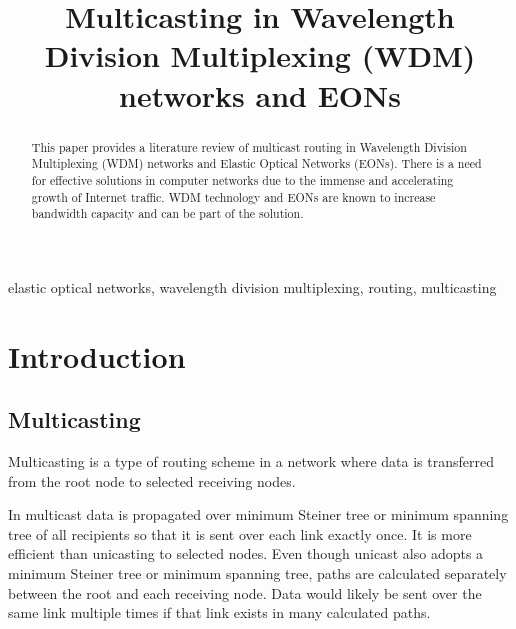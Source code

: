 \documentclass[conference]{IEEEtran}
\begin{document}
\title{Multicasting in Wavelength Division Multiplexing (WDM) networks and EONs}

\author{
\and
{}
}

\maketitle

\begin{abstract}
This paper provides a literature review of multicast routing in Wavelength Division Multiplexing (WDM) networks and Elastic Optical Networks (EONs). There is a need for effective solutions in computer networks due to the immense and accelerating growth of Internet traffic. WDM technology and EONs are known to increase bandwidth capacity and can be part of the solution.
\end{abstract}

\begin{IEEEkeywords}
elastic optical networks, wavelength division multiplexing, routing, multicasting
\end{IEEEkeywords}

\section{Introduction}

\subsection{Multicasting}
Multicasting is a type of routing scheme in a network where data is transferred from the root node to selected receiving nodes.

In multicast data is propagated over minimum Steiner tree or minimum spanning tree of all recipients so that it is sent over each link exactly once. It is more efficient than unicasting to selected nodes. Even though unicast also adopts a minimum Steiner tree or minimum spanning tree, paths are calculated separately between the root and each receiving node. Data would likely be sent over the same link multiple times if that link exists in many calculated paths.
\end{document}
